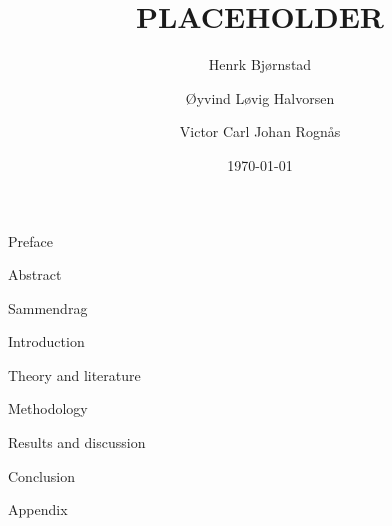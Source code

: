 \documentclass[12pt]{article}
\begin{document}

\author{Henrk Bjørnstad \and Øyvind Løvig Halvorsen \and Victor Carl Johan Rognås}
\title{PLACEHOLDER}
\date{\today}

{Preface}
\newpage

{Abstract}
\newpage

{Sammendrag}
\newpage

\begin{spacing}{0.82} %
    \listoffigures
    \newpage

    \listoftables
    \newpage
    
    \tableofcontents
    \newpage
\end{spacing}

\setcounter{page}{1}
{Introduction}

\newpage
{Theory and literature}

\newpage
{Methodology}

\newpage
{Results and discussion}

\newpage
{Conclusion}

\newpage
\newrefcontext[sorting=nyt]
\printbibliography[heading = bibintoc, title = References]

{Appendix}
\end{document}

